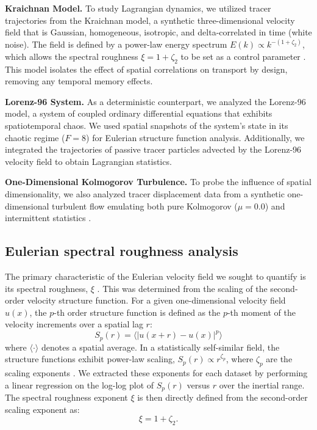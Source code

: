 \documentclass[]{article}
\begin{document}
\noindent\textbf{Kraichnan Model.} To study Lagrangian dynamics, we utilized tracer trajectories from the Kraichnan model, a synthetic three-dimensional velocity field that is Gaussian, homogeneous, isotropic, and delta-correlated in time (white noise). The field is defined by a power-law energy spectrum $E(k) \propto k^{-(1+\zeta_2)}$, which allows the spectral roughness $\xi = 1 + \zeta_2$ to be set as a control parameter \citep{considera2025transportmultifractalkraichnanflows}. This model isolates the effect of spatial correlations on transport by design, removing any temporal memory effects.

\noindent\textbf{Lorenz-96 System.} As a deterministic counterpart, we analyzed the Lorenz-96 model, a system of coupled ordinary differential equations that exhibits spatiotemporal chaos. We used spatial snapshots of the system's state in its chaotic regime ($F=8$) for Eulerian structure function analysis. Additionally, we integrated the trajectories of passive tracer particles advected by the Lorenz-96 velocity field to obtain Lagrangian statistics.

\noindent\textbf{One-Dimensional Kolmogorov Turbulence.} To probe the influence of spatial dimensionality, we also analyzed tracer displacement data from a synthetic one-dimensional turbulent flow \citep{benzi199611dimensionalturbulence,kuksin2021kolmogorovstheoryturbulencerigorous} emulating both pure Kolmogorov ($\mu=0.0$) and intermittent statistics \citep{drivas2026mathematicaltheoremsturbulence}.

\subsection{Eulerian spectral roughness analysis}
The primary characteristic of the Eulerian velocity field we sought to quantify is its spectral roughness, $\xi$ \citep{jafari2026statisticalfluxfreezingmagnetic}. This was determined from the scaling of the second-order velocity structure function. For a given one-dimensional velocity field $u(x)$, the $p$-th order structure function is defined as the $p$-th moment of the velocity increments over a spatial lag $r$:
\begin{equation}S_p(r) = \langle |u(x+r) - u(x)|^p \rangle\end{equation}
where $\langle \cdot \rangle$ denotes a spatial average. In a statistically self-similar field, the structure functions exhibit power-law scaling, $S_p(r) \propto r^{\zeta_p}$, where $\zeta_p$ are the scaling exponents \citep{eyink2000selfsimilardecaykraichnanmodel}. We extracted these exponents for each dataset by performing a linear regression on the log-log plot of $S_p(r)$ versus $r$ over the inertial range. The spectral roughness exponent $\xi$ is then directly defined from the second-order scaling exponent as:
\begin{equation}\xi = 1 + \zeta_2.\end{equation}
\end{document}

